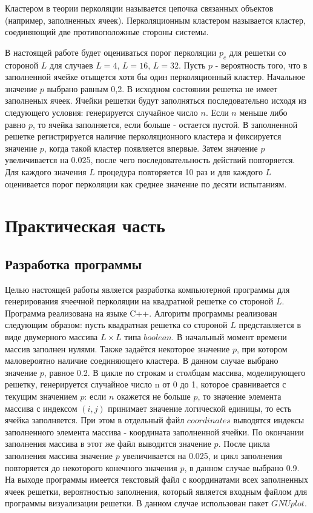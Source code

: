 \documentclass[14pt,a4paper,report]{ncc}
\begin{document}
Кластером в теории перколяции называется цепочка связанных объектов (например, заполненных ячеек). Перколяционным кластером называется кластер, соединяющий две противоположные стороны системы.
\


В настоящей работе будет оцениваться порог перколяции $p_c$ для решетки со стороной $L$ для случаев $L=4$, $L=16$, $L=32$. Пусть $p$ - вероятность того, что в заполненной ячейке отыщется хотя бы один перколяционный кластер. Начальное значение $p$ выбрано равным 0,2. В исходном состоянии решетка не имеет заполненых ячеек. Ячейки решетки будут заполняться последовательно исходя из следующего условия: генерируется случайное число $n$. Если $n$ меньше либо равно $p$, то ячейка заполняется, если больше - остается пустой. В заполненной решетке регистрируется наличие перколяционного кластера и фиксируется значение $p$, когда такой кластер появляется впервые. Затем значение $p$ увеличивается на 0.025, после чего последовательность действий повторяется. Для каждого значения $L$ процедура повторяется 10 раз и для каждого $L$ оценивается порог перколяции как среднее значение по десяти испытаниям.

\newpage\section{Практическая часть}
\subsection{Разработка программы}
Целью настоящей работы является разработка компьютерной программы для генерирования ячеечной перколяции на квадратной решетке со стороной $L$. Программа реализована на языке C++. Алгоритм программы реализован следующим образом: пусть квадратная решетка со стороной $L$ представляется в виде двумерного массива $L  \times L$ типа $boolean$. В начальный момент времени массив заполнен нулями. Также задаётся некоторое значение $p$, при котором маловероятно наличие соединяющего кластера. В данном случае выбрано значение $p$, равное 0.2. В цикле по строкам и столбцам массива, моделирующего решетку, генерируется случайное число n от 0 до 1, которое сравнивается с текущим значением $p$: если $n$ окажется не больше $p$, то значение элемента массива с индексом $(i,j)$ принимает значение логической единицы, то есть ячейка заполняется. При этом в отдельный файл $coordinates$ выводятся индексы заполненного элемента массива - координата заполненной ячейки. По окончании заполнения массива в этот же файл выводится значение $p$. После цикла заполнения массива значение $p$ увеличивается на 0.025, и цикл заполнения повторяется до некоторого конечного значения $p$, в данном случае выбрано 0.9. На выходе программы имеется текстовый файл с координатами всех заполненных ячеек решетки, вероятностью заполнения, который является входным файлом для программы визуализации решетки. В данном случае использован пакет $GNUplot$.
\
\end{document}
